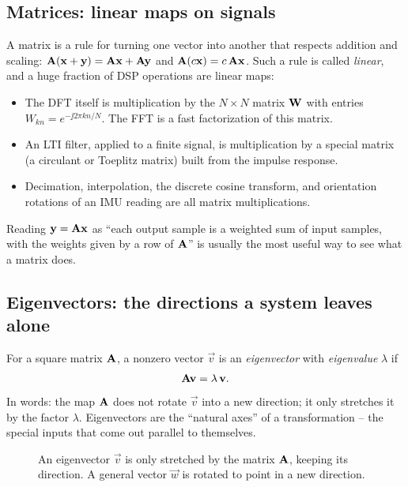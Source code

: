 \subsection{Matrices: linear maps on signals}

A matrix is a rule for turning one vector into another that respects addition and scaling:
$\mathbf{A}(\mathbf{x} + \mathbf{y}) = \mathbf{A}\mathbf{x} + \mathbf{A}\mathbf{y}$ and $\mathbf{A}(c\mathbf{x}) = c\,\mathbf{A}\mathbf{x}$.
Such a rule is called \emph{linear}, and a huge fraction of DSP operations are linear maps:
\begin{itemize}
  \item The DFT itself is multiplication by the $N\times N$ matrix $\mathbf{W}$ with entries $W_{kn} =
  e^{-\jj 2\pi kn/N}$. The FFT is a fast factorization of this matrix.
  \item An LTI filter, applied to a finite signal, is multiplication by a special matrix (a
  circulant or Toeplitz matrix) built from the impulse response.
  \item Decimation, interpolation, the discrete cosine transform, and orientation rotations of an
  IMU reading are all matrix multiplications.
\end{itemize}
Reading $\mathbf{y} = \mathbf{A}\mathbf{x}$ as ``each output sample is a weighted sum of input samples, with
the weights given by a row of $\mathbf{A}$'' is usually the most useful way to see what a matrix does.

\subsection{Eigenvectors: the directions a system leaves alone}

For a square matrix $\mathbf{A}$, a nonzero vector $\vec v$ is an \emph{eigenvector} with
\emph{eigenvalue} $\lambda$ if
\[
  \mathbf{A} \mathbf{v} = \lambda\,\mathbf{v}.
\]
In words: the map $\mathbf{A}$ does not rotate $\vec v$ into a new direction; it only stretches it by
the factor $\lambda$. Eigenvectors are the ``natural axes'' of a transformation -- the special
inputs that come out parallel to themselves.

\begin{figure}[H]
\centering
{}
\caption{An eigenvector $\vec v$ is only stretched by the matrix $\mathbf{A}$, keeping its direction. A general vector $\vec w$ is rotated to point in a new direction.}
\label{ch42:fig-eigenvector}
\end{figure}


